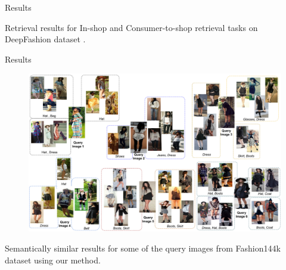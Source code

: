 \documentclass[handout]{beamer}
\begin{document}
\begin{frame}{Results}
\vspace{-1cm}
\begin{center}
  \begin{figure}
    \centering
  \end{figure}
\end{center}
Retrieval results for In-shop and Consumer-to-shop retrieval tasks on DeepFashion dataset \cite{LiuCVPR2016}.
\end{frame}

\begin{frame}{Results}
\vspace{-1cm}
\begin{center}
  \begin{figure}
    \centering
    \includegraphics[width=0.8\linewidth]{images/staqu_results}
  \end{figure}
\end{center}
Semantically similar results for some of the query images from Fashion144k dataset \cite{SimoSerraCVPR2016} using our method.
\end{frame}
\end{document}
